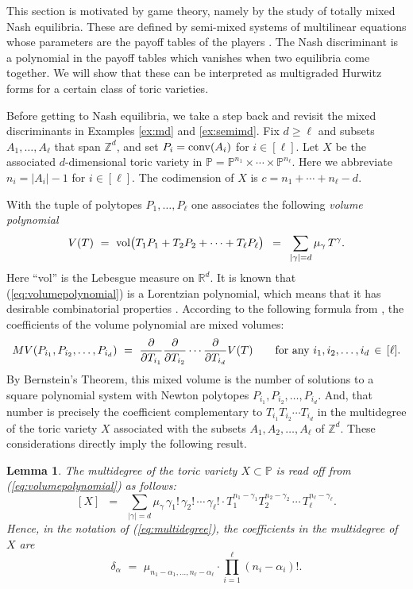 \documentclass[12pt]{article}
\newtheorem{lemma}[theorem]{Lemma}
\theoremstyle{definition}
\newcommand{\bR}{\mathbb R}
\newcommand{\bZ}{\mathbb Z}
\newcommand{\bP}{\mathbb P}
\begin{document}
This section is motivated by game theory, namely by the
study of totally mixed Nash equilibria.
These are defined by semi-mixed systems of multilinear equations
whose parameters are the payoff tables of the players \cite[Chapter 6]{CBMS}.
The Nash discriminant \cite{vectorBundleNash} is a polynomial
in the payoff tables which vanishes when two equilibria come together.
We will show that these can be interpreted as
multigraded Hurwitz forms for a certain class of toric varieties.

Before getting to Nash equilibria, we take a step back
and revisit the mixed discriminants in Examples \ref{ex:md} and \ref{ex:semimd}.
Fix $d \geq \ell$ and subsets $A_1,\ldots,A_\ell$ that span $\bZ^d$, and set
$P_i = {\rm conv}(A_i)$ for $i \in [\ell]$. Let $X $ be  the
associated $d$-dimensional toric variety in $ \bP = \bP^{n_1} \times \cdots \times \bP^{n_\ell} $.
Here  we abbreviate $n_i = |A_i| - 1$ for $i \in [\ell]$.
The codimension  of $X$ is $c = n_1+\cdots+n_\ell - d$.

With the tuple of polytopes $P_1,\ldots,P_\ell$ one associates the following {\em volume polynomial}
\begin{equation}
\label{eq:volumepolynomial}
V(T) \,\,=\,\, {\rm vol} \bigl(T_1 P_1 + T_2 P_2 + \cdots + T_\ell P_\ell \bigr)  \,\,\, = \,\,\, 
\sum_{|\gamma| = d}  \mu_\gamma \,T^\gamma.
\end{equation}
Here ``vol'' is the Lebesgue measure on $\bR^d$.
It is known that (\ref{eq:volumepolynomial}) is a Lorentzian polynomial,
which means that it has desirable combinatorial properties \cite{Huh}.
According to the following formula from \cite[Section 2.1]{Huh},
the coefficients of the volume polynomial are mixed volumes:
$$ MV ( P_{i_1},P_{i_2},\ldots, P_{i_d}) \,\, = \,\, \frac{\partial}{\partial T_{i_1}} 
 \frac{\partial}{\partial T_{i_2}}  \cdots   \frac{\partial}{\partial T_{i_d}}  V(T) \qquad
 \hbox{for any} \,\, i_1,i_2,\ldots,i_d \,\in\,  [\ell].
 $$
By Bernstein's Theorem, this mixed volume is the number of
solutions to a square polynomial system with Newton polytopes
$P_{i_1},P_{i_2},\ldots, P_{i_d} $. And, that number is precisely
 the coefficient complementary to $ T_{i_1} T_{i_2} \cdots T_{i_d}$ in the
multidegree of the toric variety $X$ associated with the subsets $A_1,A_2,\ldots,A_\ell$ of $\bZ^d$.
These considerations directly imply the following result.

\begin{lemma} \label{lem:MV}
The multidegree of the toric variety $X \subset \bP$ is read off from (\ref{eq:volumepolynomial}) as follows:
$$ [X] \,\,\, = \,\,\, 
\sum_{|\gamma| = d}  \mu_\gamma \,\gamma_1! \,\gamma_2! \,\cdots\, \gamma_\ell ! \cdot
T_1^{n_1-\gamma_1} T_2^{n_2-\gamma_2}\,\cdots\, T_\ell^{n_\ell-\gamma_\ell} .
$$
Hence, in the notation of (\ref{eq:multidegree}), the coefficients in the multidegree of $X$ are
$$ \delta_\alpha \,\, = \,\, \mu_{n_1-\alpha_1,\ldots,n_\ell-\alpha_\ell} \cdot \prod_{i=1}^\ell (n_i - \alpha_i)!. $$
\end{lemma}
\end{document}
